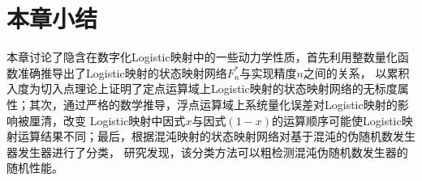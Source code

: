 \section{本章小结}

本章讨论了隐含在数字化Logistic映射中的一些动力学性质，首先利用整数量化函数准确推导出了Logistic映射的状态映射网络$F^*_{n}$与实现精度$n$之间的关系，
以累积入度为切入点理论上证明了定点运算域上Logistic映射的状态映射网络的无标度属性；其次，通过严格的数学推导，浮点运算域上系统量化误差对Logistic映射的影响被厘清，改变
Logistic映射中因式$x$与因式$(1-x)$的运算顺序可能使Logistic映射运算结果不同；最后，根据混沌映射的状态映射网络对基于混沌的伪随机数发生器发生器进行了分类，
研究发现，该分类方法可以粗检测混沌伪随机数发生器的随机性能。
